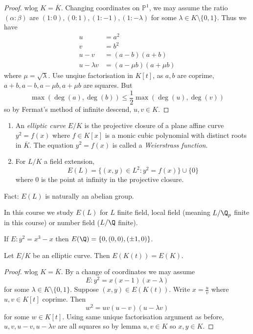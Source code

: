 \documentclass[a4paper]{article}
\theoremstyle{definition}
\renewcommand*{\P}{\mathbb{P}}
\begin{document}
\begin{proof}
  wlog \(K = \overline K\). Changing coordinates on \(\P^1\), we may assume the ratio \((\alpha: \beta)\) are \((1: 0), (0: 1), (1: -1), (1: -\lambda)\) for some \(\lambda \in K \setminus \{0, 1\}\). Thus we have
  \begin{align*}
    u &= a^2 \\
    v &= b^2 \\
    u - v &= (a - b)(a + b) \\
    u - \lambda v &= (a - \mu b)(a + \mu b)
  \end{align*}
  where \(\mu = \sqrt \lambda\). Use unqiue factorisation in \(K[t]\),  as \(a, b\) are coprime, \(a + b, a - b, a - \mu b, a + \mu b\) are squares. But
  \[
    \max (\deg (a), \deg (b)) \leq \frac{1}{2} \max (\deg (u), \deg (v))
  \]
  so by Fermat's method of infinite descend, \(u, v \in K\).
\end{proof}

\begin{definition}\leavevmode
  \begin{enumerate}
  \item An \emph{elliptic curve} \(E/K\) is the projective closure of a plane affine curve \(y^2 = f(x)\) where \(f \in K[x]\) is a monic cubic polynomial with distinct roots in \(\overline K\). The equation \(y^2 = f(x)\) is called a \emph{Weierstrass function}.
  \item For \(L/K\) a field extension,
    \[
      E(L) = \{(x, y) \in L^2: y^2 = f(x)\} \cup \{0\}
    \]
    where \(0\) is the point at infinity in the projective closure.
  \end{enumerate}
\end{definition}

Fact: \(E(L)\) is naturally an abelian group.

In this course we study \(E(L)\) for \(L\) finite field, local field (meaning \(L/\Q_p\) finite in this course) or number field (\(L/\Q\) finite).

\begin{theorem}
  If \(E: y^2 = x^3 - x\) then \(E(\Q) = \{0, (0, 0), (\pm 1, 0)\}\).
\end{theorem}

\begin{corollary}
  Let \(E/K\) be an elliptic curve. Then \(E(K(t)) = E(K)\).
\end{corollary}

\begin{proof}
  wlog \(K = \overline K\). By a change of coordinates we may assume
  \[
    E: y^2 = x(x - 1)(x - \lambda)
  \]
  for some \(\lambda \in K \setminus \{0, 1\}\). Suppose \((x, y) \in E(K(t))\). Write \(x = \frac{u}{v}\) where \(u, v \in K[t]\) coprime. Then
  \[
    w^2 = uv(u - v)(u - \lambda v)
  \]
  for some \(w \in K[t]\). Using same unique factorisation argument as before, \(u, v, u - v, u - \lambda v\) are all squares so by lemma \(u, v \in K\) so \(x, y \in K\).
\end{proof}
\end{document}
